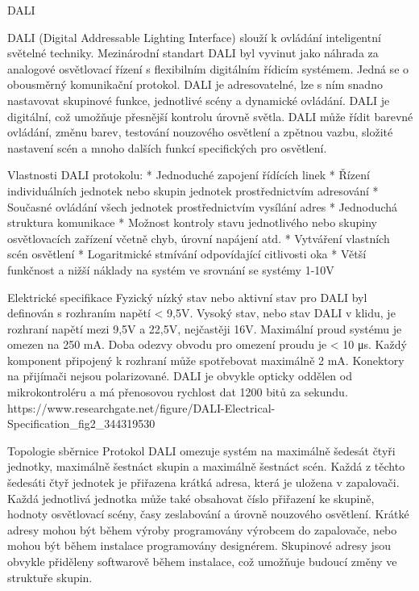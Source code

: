 \chap DALI 

DALI (Digital Addressable Lighting Interface) slouží k ovládání inteligentní světelné techniky. Mezinárodní standart DALI byl vyvinut jako náhrada za analogové osvětlovací řízení s flexibilním digitálním řídicím systémem. Jedná se o obousměrný komunikační protokol. 
DALI je adresovatelné, lze s ním snadno nastavovat skupinové funkce, jednotlivé scény a dynamické ovládání.
DALI je digitální, což umožňuje přesnější kontrolu úrovně světla.
DALI může řídit barevné ovládání, změnu barev, testování nouzového osvětlení a zpětnou vazbu, složité nastavení scén a mnoho dalších funkcí specifických pro osvětlení.

\medskip
Vlastnosti DALI protokolu:
\begitems
    * Jednoduché zapojení řídících linek
    * Řízení individuálních jednotek nebo skupin jednotek prostřednictvím adresování
    * Současné ovládání všech jednotek prostřednictvím vysílání adres
    * Jednoduchá struktura komunikace
    * Možnost kontroly stavu jednotlivého nebo skupiny osvětlovacích zařízení včetně chyb, úrovní napájení atd.
    * Vytváření vlastních scén osvětlení
    * Logaritmické stmívání odpovídající citlivosti oka
    * Větší funkčnost a nižší náklady na systém ve srovnání se systémy 1-10V
\enditems

\sec Elektrické specifikace
Fyzický nízký stav nebo aktivní stav pro DALI byl definován s rozhraním napětí < 9,5V. Vysoký stav, nebo stav DALI v klidu, je rozhraní napětí mezi 9,5V a 22,5V, nejčastěji 16V. Maximální proud systému je omezen na 250 mA. Doba odezvy obvodu pro omezení proudu je < 10 μs. Každý komponent připojený k rozhraní může spotřebovat maximálně 2 mA. Konektory na přijímači nejsou polarizované. DALI je obvykle opticky oddělen od mikrokontroléru a má přenosovou rychlost dat 1200 bitů za sekundu.
\medskip
https://www.researchgate.net/figure/DALI-Electrical-Specification_fig2_344319530
\medskip

\sec Topologie sběrnice
Protokol DALI omezuje systém na maximálně šedesát čtyři jednotky, maximálně šestnáct skupin a maximálně šestnáct scén. Každá z těchto šedesáti čtyř jednotek je přiřazena krátká adresa, která je uložena v zapalovači. Každá jednotlivá jednotka může také obsahovat číslo přiřazení ke skupině, hodnoty osvětlovací scény, časy zeslabování a úrovně nouzového osvětlení. Krátké adresy mohou být během výroby programovány výrobcem do zapalovače, nebo mohou být během instalace programovány designérem. Skupinové adresy jsou obvykle přiděleny softwarově během instalace, což umožňuje budoucí změny ve struktuře skupin.

